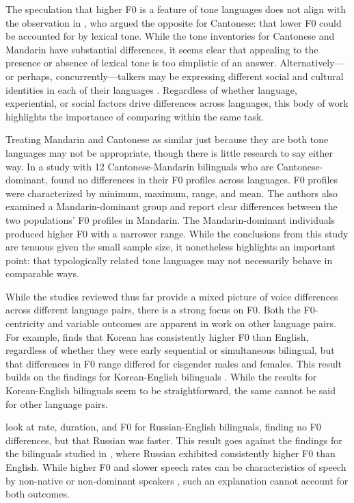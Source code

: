 The speculation that higher F0 is a feature of tone languages does not align with the observation in \citet{ng_2012_ltas}, who argued the opposite for Cantonese: that lower F0 could be accounted for by lexical tone. While the tone inventories for Cantonese and Mandarin have substantial differences, it seems clear that appealing to the presence or absence of lexical tone is too simplistic of an answer. Alternatively---or perhaps, concurrently---talkers may be expressing different social and cultural identities in each of their languages \citep{loveday_1981_pitch, voigt_2016_between}. Regardless of whether language, experiential, or social factors drive differences across languages, this body of work highlights the importance of comparing within the same task.

Treating Mandarin and Cantonese as similar just because they are both tone languages may not be appropriate, though there is little research to say either way. In a study with 12 Cantonese-Mandarin bilinguals who are Cantonese-dominant, \citet{yang_2020_f0} found no differences in their F0 profiles across languages. F0 profiles were characterized by minimum, maximum, range, and mean. The authors also examined a Mandarin-dominant group and report clear differences between the two populations' F0 profiles in Mandarin. The Mandarin-dominant individuals produced higher F0 with a narrower range. While the conclusions from this study are tenuous given the small sample size, it nonetheless highlights an important point: that typologically related tone languages may not necessarily behave in comparable ways.

While the studies reviewed thus far provide a mixed picture of voice differences across different language pairs, there is a strong focus on F0. Both the F0-centricity and variable outcomes are apparent in work on other language pairs. For example, \citet{cheng_2020_f0} finds that Korean has consistently higher F0 than English, regardless of whether they were early sequential or simultaneous bilingual, but that differences in F0 range differed for cisgender males and females. This result builds on the findings for Korean-English bilinguals \citep{lee_2017_bilingual}. While the results for Korean-English bilinguals seem to be straightforward, the same cannot be said for other language pairs. 

\citet{ryabov_2016_self} look at rate, duration, and F0 for Russian-English bilinguals, finding no F0 differences, but that Russian was faster. This result goes against the findings for the bilinguals studied in \citet{altenberg_2006_f0}, where Russian exhibited consistently higher F0 than English. While higher F0 and slower speech rates can be characteristics of speech by non-native or non-dominant speakers \citep{jarvinen_2013_speaking}, such an explanation cannot account for both outcomes. 

